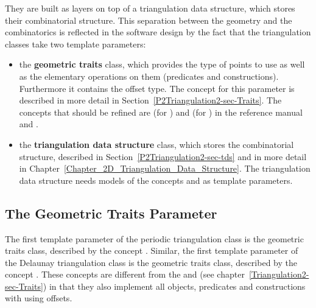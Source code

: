 They are built as layers on top of a triangulation data structure,
which stores their combinatorial structure. This separation between
the geometry and the combinatorics is reflected in the software design
by the fact that the triangulation classes take two template
parameters: 
\begin{itemize}
%
\item {} the \textbf{geometric traits} class, which provides the type
  of points to use as well as the elementary operations on them
  (predicates and constructions). Furthermore it contains the offset
  type.  The concept for this parameter is described in more detail in
  Section~\ref{P2Triangulation2-sec-Traits}. The concepts that should
  be refined are  (for
  ) and
   (for
  ) in the reference
  manual and
  .

\item {} the \textbf{triangulation data structure} class, which stores
  the combinatorial structure, described in
  Section~\ref{P2Triangulation2-sec-tds} and in more detail in
  Chapter~\ref{Chapter_2D_Triangulation_Data_Structure}. The
  triangulation data structure needs models of the concepts
   and
   as template parameters.
\end{itemize}

\subsection{The Geometric Traits Parameter\label{P2Triangulation2-sec-Traits}}
The first template parameter of the periodic triangulation class
 is the geometric traits
class, described by the concept .
Similar, the first template parameter of the Delaunay triangulation
class  is the
geometric traits class, described by the concept
.  These concepts are
different from the  and
 (see
chapter~\ref{Triangulation2-sec-Traits}) in that they also implement
all objects, predicates and constructions with using offsets.

